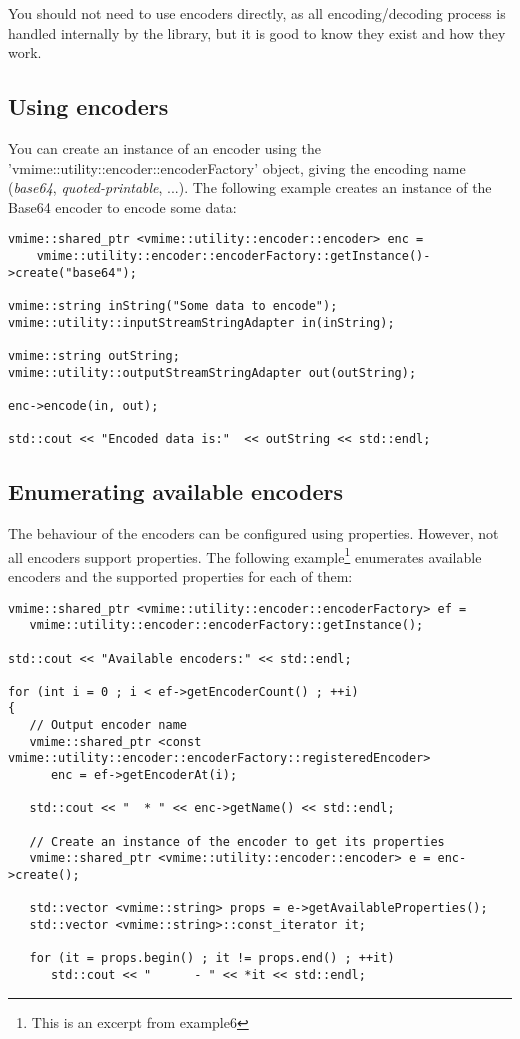 You should not need to use encoders directly, as all encoding/decoding
process is handled internally by the library, but it is good to know
they exist and how they work.

\subsection{Using encoders} %

You can create an instance of an encoder using the 'vmime::utility::encoder::encoderFactory'
object, giving the encoding name ({\it base64}, {\it quoted-printable}, ...).
The following example creates an instance of the Base64 encoder to encode
some data:

\begin{lstlisting}[caption={A simple example of using an encoder}]
vmime::shared_ptr <vmime::utility::encoder::encoder> enc =
    vmime::utility::encoder::encoderFactory::getInstance()->create("base64");

vmime::string inString("Some data to encode");
vmime::utility::inputStreamStringAdapter in(inString);

vmime::string outString;
vmime::utility::outputStreamStringAdapter out(outString);

enc->encode(in, out);

std::cout << "Encoded data is:"  << outString << std::endl;
\end{lstlisting}

\subsection{Enumerating available encoders} %

The behaviour of the encoders can be configured using properties. However,
not all encoders support properties. The following example\footnote{This is
an excerpt from {\vexample example6}} enumerates available encoders and the
supported properties for each of them:

\begin{lstlisting}[caption={Enumerating encoders and their properties}]
vmime::shared_ptr <vmime::utility::encoder::encoderFactory> ef =
   vmime::utility::encoder::encoderFactory::getInstance();

std::cout << "Available encoders:" << std::endl;

for (int i = 0 ; i < ef->getEncoderCount() ; ++i)
{
   // Output encoder name
   vmime::shared_ptr <const vmime::utility::encoder::encoderFactory::registeredEncoder>
      enc = ef->getEncoderAt(i);

   std::cout << "  * " << enc->getName() << std::endl;

   // Create an instance of the encoder to get its properties
   vmime::shared_ptr <vmime::utility::encoder::encoder> e = enc->create();

   std::vector <vmime::string> props = e->getAvailableProperties();
   std::vector <vmime::string>::const_iterator it;

   for (it = props.begin() ; it != props.end() ; ++it)
      std::cout << "      - " << *it << std::endl;
\end{lstlisting}


